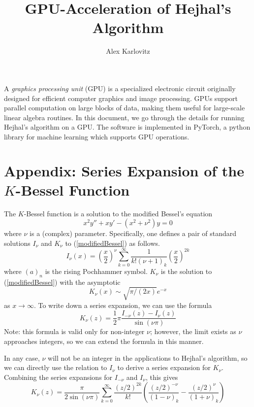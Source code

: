 \documentclass[]{article}
\title{GPU-Acceleration of Hejhal's Algorithm}
\author{Alex Karlovitz}
\date{}
\begin{document}
	
	\maketitle
	
A \textit{graphics processing unit} (GPU) is a specialized electronic circuit originally designed for efficient computer graphics and image processing.
GPUs support parallel computation on large blocks of data, making them useful for large-scale linear algebra routines.
In this document, we go through the details for running Hejhal's algorithm on a GPU.
The software is implemented in PyTorch, a python library for machine learning which supports GPU operations.

\section*{Appendix: Series Expansion of the $K$-Bessel Function}

The $K$-Bessel function is a solution to the modified Bessel's equation
\begin{equation}\label{modifiedBessel}
	x^2y'' + xy' - (x^2 + \nu^2)y = 0
\end{equation}
where $\nu$ is a (complex) parameter.
Specifically, one defines a pair of standard solutions $I_\nu$ and $K_\nu$ to (\ref{modifiedBessel}) as follows.
$$
I_\nu(x) = \left(\frac{x}{2}\right)^\nu \sum_{k = 0}^{\infty}\frac{1}{k!(\nu + 1)_k}\left(\frac{x}{2}\right)^{2k}
$$
where $(a)_n$ is the rising Pochhammer symbol.
$K_\nu$ is the solution to (\ref{modifiedBessel}) with the asymptotic
$$
K_\nu(x) \sim \sqrt{\pi/(2x)}e^{-x}
$$
as $x \rightarrow \infty$.
To write down a series expansion, we can use the formula
$$
K_\nu(z) = \frac{1}{2}\pi\frac{I_{-\nu}(z) - I_\nu(z)}{\sin(\nu\pi)}
$$
Note: this formula is valid only for non-integer $\nu$; however, the limit exists as $\nu$ approaches integers, so we can extend the formula in this manner.

In any case, $\nu$ will not be an integer in the applications to Hejhal's algorithm, so we can directly use the relation to $I_\nu$ to derive a series expansion for $K_\nu$.
Combining the series expansions for $I_{-\nu}$ and $I_\nu$, this gives
$$
K_\nu(z) = \frac{\pi}{2\sin(\nu\pi)} \sum_{k = 0}^{\infty} \frac{(z/2)^{2k}}{k!}\left( \frac{(z/2)^{-\nu}}{(1 - \nu)_k} - \frac{(z/2)^\nu}{(1 + \nu)_k} \right)
$$
	
\end{document}
